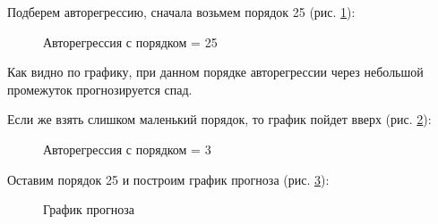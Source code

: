 \documentclass[a4paper,oneside,14pt]{extreport}
\begin{document}
Подберем авторегрессию, сначала возьмем порядок 25 (рис. \ref{task2_predict_ar25}):
\begin{figure}[!h]
	\caption{Авторегрессия с порядком = 25}
	\label{task2_predict_ar25}
\end{figure}

Как видно по графику, при данном порядке авторегрессии через небольшой промежуток прогнозируется спад.

\newpage
Если же взять слишком маленький порядок, то график пойдет вверх (рис. \ref{task2_predict_ar3}):
\begin{figure}[!h]
	\caption{Авторегрессия с порядком = 3}
	\label{task2_predict_ar3}
\end{figure}

Оставим порядок 25 и построим график прогноза (рис. \ref{task2_predict}):
\begin{figure}[!h]
	\caption{График прогноза}
	\label{task2_predict}
\end{figure}
\end{document}
